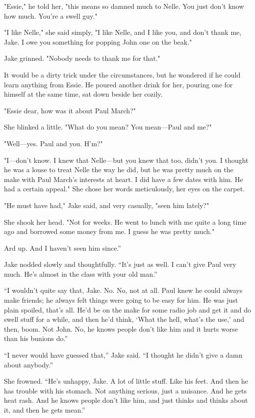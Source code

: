 \documentclass{novel}
\begin{document}
"Essie," he told her, "this means so damned much to Nelle. You just don't know how much. You're a swell guy."

"I like Nelle," she said simply, "I like Nelle, and I like you, and don't thank me, Jake. I owe you something for popping John one on the beak."

Jake grinned. "Nobody needs to thank me for that."

It would be a dirty trick under the circumstances, but he wondered if he could learn anything from Essie. He poured another drink for her, pouring one for himself at the same time, sat down beside her cozily.

"Essie dear, how was it about Paul March?"

She blinked a little. "What do you mean? You mean—Paul and me?"

"Well—yes. Paul and you. H'm?"

"I—don't know. I knew that Nelle—but you knew that too, didn't you. I thought he was a louse to treat Nelle the way he did, but he was pretty much on the make with Paul March's interests at heart. I did have a few dates with him. He had a certain appeal." She chose her words meticulously, her eyes on the carpet.

"He must have had," Jake said, and very casually, "seen him lately?"

She shook her head. "Not for weeks. He went to lunch with me quite a long time ago and borrowed some money from me. I guess he was pretty much."

Ard up. And I haven’t seen him since.”

Jake nodded slowly and thoughtfully. “It’s just as well. I can’t give Paul very much. He’s almost in the class with your old man.”

“I wouldn’t quite say that, Jake. No. No, not at all. Paul knew he could always make friends; he always felt things were going to be easy for him. He was just plain spoiled, that’s all. He’d be on the make for some radio job and get it and do swell stuff for a while, and then he’d think, ‘What the hell, what’s the use,’ and then, boom. Not John. No, he knows people don’t like him and it hurts worse than his bunions do.”

“I never would have guessed that,” Jake said. “I thought he didn’t give a damn about anybody.”

She frowned. “He’s unhappy, Jake. A lot of little stuff. Like his feet. And then he has trouble with his stomach. Not anything serious, just a nuisance. And he gets heat rash. And he knows people don’t like him, and just thinks and thinks about it, and then he gets mean.”
\end{document}
